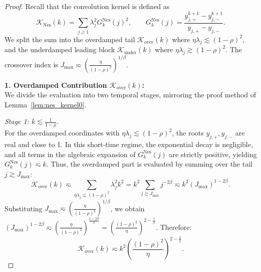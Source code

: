 \begin{proof}
Recall that the convolution kernel is defined as
\[
    \mathcal K_{\mathrm{Nes}}(k)=\sum_{j\ge1}\lambda_j^2G_k^{\mathrm{Nes}}(j)^2,
    \qquad
    G_k^{\mathrm{Nes}}(j)=\frac{y_{j,+}^{k+1}-y_{j,-}^{k+1}}{y_{j,+}-y_{j,-}}.
\]
We split the sum into the overdamped tail $\mathcal{K}_{\mathrm{over}}(k)$ where $\eta\lambda_j\lesssim(1-\rho)^2$, and the underdamped leading block $\mathcal{K}_{\mathrm{under}}(k)$ where $\eta\lambda_j\gtrsim(1-\rho)^2$. The crossover index is $J_{\max} \eqsim \left(\frac{\eta}{(1-\rho)^2}\right)^{1/\beta}$.

\textbf{1. Overdamped Contribution $\mathcal{K}_{\mathrm{over}}(k)$:} \\
We divide the evaluation into two temporal stages, mirroring the proof method of Lemma~\ref{lem:nes_kernel0}.

\textit{Stage 1: $k \lesssim \frac{1}{1-\rho}$.} \\
For the overdamped coordinates with $\eta\lambda_j\lesssim (1-\rho)^2$, the roots $y_{j,+}, y_{j,-}$ are real and close to 1. In this short-time regime, the exponential decay is negligible, and all terms in the algebraic expansion of $G_k^{\mathrm{Nes}}(j)$ are strictly positive, yielding $G_k^{\mathrm{Nes}}(j) \eqsim k$. Thus, the overdamped part is evaluated by summing over the tail $j \gtrsim J_{\max}$:
\[
    \mathcal{K}_{\mathrm{over}}(k) \eqsim \sum_{\eta\lambda_j\lesssim (1-\rho)^2} \lambda_j^2 k^2 = k^2 \sum_{j \gtrsim J_{\max}} j^{-2\beta} \eqsim k^2 (J_{\max})^{1-2\beta}.
\]
Substituting $J_{\max} \eqsim \left(\frac{\eta}{(1-\rho)^2}\right)^{1/\beta}$, we obtain $(J_{\max})^{1-2\beta} \eqsim \left(\frac{\eta}{(1-\rho)^2}\right)^{\frac{1-2\beta}{\beta}} = \left(\frac{(1-\rho)^2}{\eta}\right)^{2-\frac1\beta}$. Therefore:
\[
    \mathcal{K}_{\mathrm{over}}(k) \eqsim k^2 \left(\frac{(1-\rho)^2}{\eta}\right)^{2-\frac1\beta}.
\]


\end{proof}
